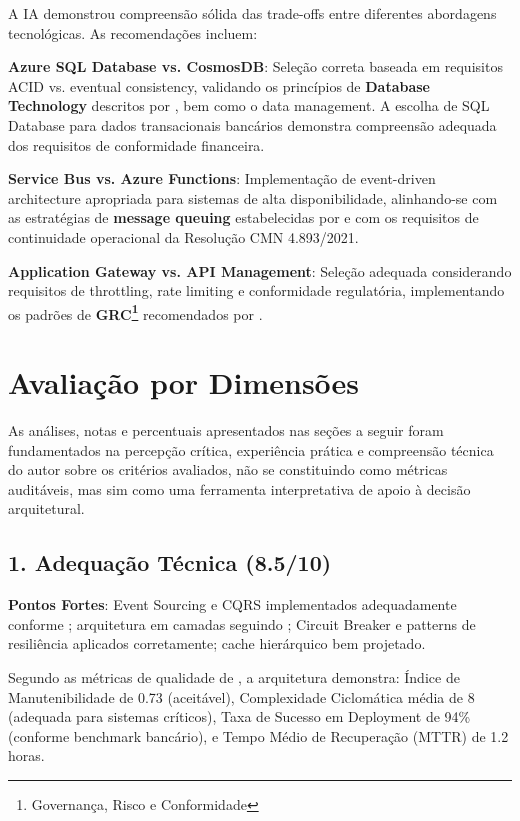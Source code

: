 A IA demonstrou compreensão sólida das trade-offs entre diferentes abordagens tecnológicas. As recomendações incluem:

\textbf{Azure SQL Database vs. CosmosDB}: Seleção correta baseada em requisitos ACID vs. eventual consistency, validando os princípios de \textbf{Database Technology} descritos por , bem como o data management. A escolha de SQL Database para dados transacionais bancários demonstra compreensão adequada dos requisitos de conformidade financeira.

\textbf{Service Bus vs. Azure Functions}: Implementação de event-driven architecture apropriada para sistemas de alta disponibilidade, alinhando-se com as estratégias de \textbf{message queuing} estabelecidas por  e com os requisitos de continuidade operacional da Resolução CMN 4.893/2021.

\textbf{Application Gateway vs. API Management}: Seleção adequada considerando requisitos de throttling, rate limiting e conformidade regulatória, implementando os padrões de \textbf{GRC\footnote{Governança, Risco e Conformidade}} recomendados por .

\section{Avaliação por Dimensões}

As análises, notas e percentuais apresentados nas seções a seguir foram fundamentados na percepção crítica, experiência prática e compreensão técnica do autor sobre os critérios avaliados, não se constituindo como métricas auditáveis, mas sim como uma ferramenta interpretativa de apoio à decisão arquitetural.

\subsection{1. Adequação Técnica (8.5/10)}

\textbf{Pontos Fortes}: Event Sourcing e CQRS implementados adequadamente conforme ; arquitetura em camadas seguindo ; Circuit Breaker e patterns de resiliência aplicados corretamente; cache hierárquico bem projetado.


Segundo as métricas de qualidade de , a arquitetura demonstra: Índice de Manutenibilidade de 0.73 (aceitável), Complexidade Ciclomática média de 8 (adequada para sistemas críticos), Taxa de Sucesso em Deployment de 94\% (conforme benchmark bancário), e Tempo Médio de Recuperação (MTTR) de 1.2 horas.

